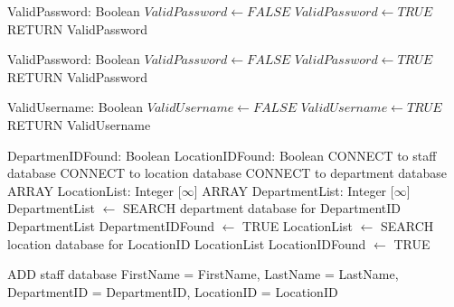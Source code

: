 \begin{algorithm}[H]
\begin{algorithmic}
\State ValidPassword: Boolean
\State$ValidPassword \leftarrow FALSE$
	\State$ValidPassword \leftarrow TRUE$
	\EndIf
\State RETURN ValidPassword
\EndFunction
\end{algorithmic}
\end{algorithm}

\begin{algorithm}[H]
\begin{algorithmic}
\State ValidPassword: Boolean
\State$ValidPassword \leftarrow FALSE$
	\State $ValidPassword \leftarrow TRUE$
\EndIf
\State RETURN ValidPassword
\EndFunction
\end{algorithmic}
\end{algorithm}

\begin{algorithm}[H]
\begin{algorithmic}
\State ValidUsername: Boolean
\State$ValidUsername \leftarrow FALSE$
	\State $ValidUsername \leftarrow TRUE$
\EndIf
\State RETURN ValidUsername
\EndFunction
\end{algorithmic}
\end{algorithm}

\begin{algorithm}[H]
\begin{algorithmic}
\State DepartmenIDFound: Boolean
\State LocationIDFound: Boolean
\State CONNECT to staff database
\State CONNECT to location database
\State CONNECT to department database
\State ARRAY LocationList: Integer [$\infty$]
\State ARRAY DepartmentList: Integer [$\infty$]
\State DepartmentList $\leftarrow$ SEARCH department database for DepartmentID
 {DepartmentList}
		\State DepartmentIDFound $\leftarrow$ TRUE
	\EndIf
\EndFor
\State LocationList $\leftarrow$ SEARCH location database for LocationID
 {LocationList}
		\State LocationIDFound $\leftarrow$ TRUE
	\EndIf
\EndFor

	\State ADD staff database FirstName = FirstName, LastName = LastName, DepartmentID = DepartmentID, LocationID = LocationID
\EndIf

\EndFunction
\end{algorithmic}
\end{algorithm}

